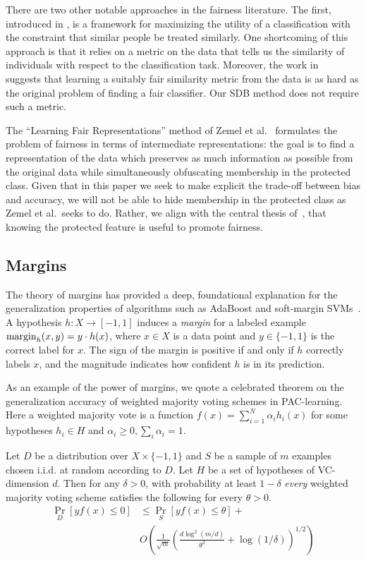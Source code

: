 \documentclass[twoside,leqno,twocolumn]{article}
\begin{document}
There are two other notable approaches in the fairness literature. The first,
introduced in \cite{DworkHPR12}, is a framework for maximizing the utility of a
classification with the constraint that similar people be treated similarly.
One shortcoming of this approach is that it relies on a metric on the data that
tells us the similarity of individuals with respect to the classification task.
Moreover, the work in~\cite{DworkHPR12} suggests that learning a suitably fair
similarity metric from the data is as hard as the original problem of finding a
fair classifier. Our SDB method does not require such a metric.

The ``Learning Fair Representations'' method of Zemel et al.~\cite{ZemelWSPD13}
formulates the problem of fairness in terms of intermediate representations:
the goal is to find a representation of the data which preserves as much
information as possible from the original data while simultaneously obfuscating
membership in the protected class.  Given that in this paper we seek to make
explicit the trade-off between bias and accuracy, we will not be able to hide
membership in the protected class as Zemel et al.~seeks to do. Rather, we align
with the central thesis of~\cite{DworkHPR12}, that knowing the protected
feature is useful to promote fairness. 

\subsection{Margins}

The theory of margins has provided a deep, foundational explanation for the
generalization properties of algorithms such as AdaBoost and soft-margin
SVMs~\cite{SchapireFBL98,CortesV95}. A hypothesis $h: X \to [-1,1]$ induces a
\emph{margin} for a labeled example $\textup{margin}_h(x,y) = y\cdot h(x)$,
where $x\in X$ is a data point and $y\in\{-1,1\}$ is the correct label for $x$.
The sign of the margin is positive if and only if $h$ correctly labels $x$, and
the magnitude indicates how confident $h$ is in its prediction.

As an example of the power of margins, we quote a celebrated theorem on the
generalization accuracy of weighted majority voting schemes in PAC-learning.
Here a weighted majority vote is a function $f(x) = \sum_{i=1}^N \alpha_i
h_i(x)$ for some hypotheses $h_i \in H$ and $\alpha_i \geq 0, \sum_i \alpha_i =
1$.

\begin{theorem} \cite{SchapireFBL98} \label{thm:margin-generalization}
Let $D$ be a distribution over $X \times \{ -1,1\}$ and $S$ be a sample of $m$
examples chosen i.i.d. at random according to $D$. Let $H$ be a set of
hypotheses of VC-dimension $d$. Then for any $\delta > 0$, with probability at
least $1-\delta$ \emph{every} weighted majority voting scheme satisfies the
following for every $\theta > 0$.
$$
\begin{aligned}\Pr_D[yf(x) \leq 0] &\leq \Pr_S[yf(x) \leq \theta] + \\ & O \left (
\frac{1}{\sqrt{m}} \left ( \frac{d \log^2(m/d)}{\theta^2} + \log (1/\delta) \right )^{1/2} \right )
\end{aligned}
$$
\end{theorem}
\end{document}
